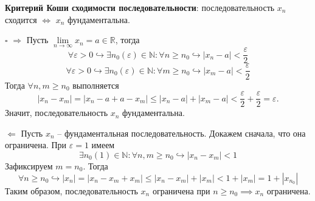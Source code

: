 \documentclass[12pt, a4paper, reqno]{article}
\begin{document}
    \textbf{Критерий Коши сходимости последовательности}: последовательность $x_n$ сходится $\iff$
    $x_n$ фундаментальна.

    $\square$ $\boxed{\Rightarrow}$ Пусть $\lim\limits_{n\to\infty} x_n = a\in\mathbb{R}$, тогда
    \begin{equation*}
        \forall\varepsilon > 0 \hookrightarrow \exists n_0(\varepsilon)\in\mathbb{N}: \forall n \geq
        n_0 \hookrightarrow |x_n - a| < \dfrac{\varepsilon}{2}
    \end{equation*}
    \begin{equation*}
        \forall\varepsilon > 0 \hookrightarrow \exists n_0(\varepsilon)\in\mathbb{N}: \forall m \geq
        n_0 \hookrightarrow |x_m - a| < \dfrac{\varepsilon}{2}
    \end{equation*}
    Тогда $\forall n, m \geq n_0$ выполняется
    \begin{equation*}
        |x_n - x_m| = |x_n - a + a - x_m| \leq |x_n - a| + |x_m - a| < \dfrac{\varepsilon}{2} +
        \dfrac{\varepsilon}{2} = \varepsilon.
    \end{equation*}
    Значит, последовательность $x_n$ фундаментальна.

    $\boxed{\Leftarrow}$ Пусть $x_n$ -- фундаментальная последовательность. Докажем сначала, что она
    ограничена. При $\varepsilon = 1$ имеем
    \begin{equation*}
        \exists n_0(1)\in\mathbb{N}: \forall n, m \geq n_0 \hookrightarrow |x_n - x_m| < 1
    \end{equation*}
    Зафиксируем $m = n_0$. Тогда
    \begin{equation*}
        \forall n \geq n_0 \hookrightarrow |x_n| = |x_n - x_m + x_m| \leq |x_n - x_m| + |x_m| <
        1 + |x_m| = 1 + |x_{n_0}|
    \end{equation*}
    Таким образом, последовательность $x_n$ ограничена при $n \geq n_0 \implies x_n$ ограничена.
\end{document}
